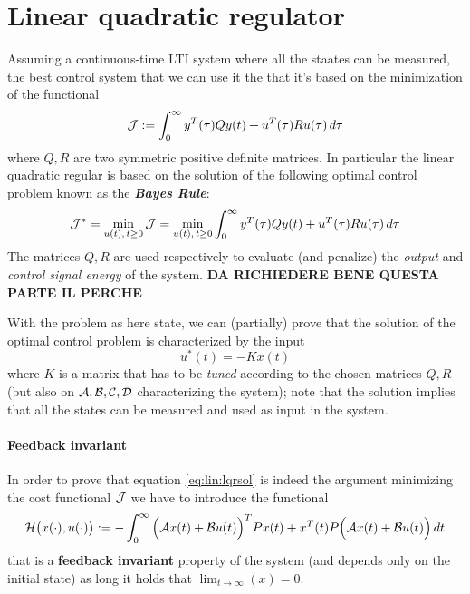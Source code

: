 \section{Linear quadratic regulator}
	Assuming a continuous-time LTI system where all the staates can be measured, the best control system that we can use it the  that it's based on the minimization of the functional
	\begin{equation}
		\mathcal{J} := \int_0^\infty y^T(\tau) Q y(t) + u^T(\tau) R u(\tau)\, d\tau
	\end{equation}
	where $Q,R$ are two symmetric positive definite matrices. In particular the linear quadratic regular is based on the solution of the following optimal control problem known as the \textbf{\textit{Bayes Rule}}:
	\begin{equation}
		\mathcal{J}^* = \min_{u(t), \, t\geq 0} \mathcal{J} = \min_{u(t), \, t\geq 0} \int_0^\infty y^T(\tau) Q y(t) + u^T(\tau) R u(\tau)\, d\tau
	\end{equation}
	The matrices $Q,R$ are used respectively to evaluate (and penalize) the \textit{output} and \textit{control signal energy} of the system. \textbf{DA RICHIEDERE BENE QUESTA PARTE IL PERCHE}
	
	With the problem as here state, we can (partially) prove that the solution of the optimal control problem is characterized by the input
	\begin{equation} \label{eq:lin:lqrsol}
		u^*(t) = - K x(t)
	\end{equation}
	where $K$ is a matrix that has to be \textit{tuned} according to the chosen matrices $Q,R$ (but also on $\mathcal{A},\mathcal{B},\mathcal{C},\mathcal{D}$ characterizing the system); note that the solution implies that all the states can be measured and used as input in the system.
		
	\paragraph{Feedback invariant} In order to prove that equation \ref{eq:lin:lqrsol} is indeed the argument minimizing the cost functional $\mathcal{J}$ we have to introduce the functional
	\begin{equation} \label{eq:lin:feedbackinvariant}
		\mathcal H\big(x(\cdot), u(\cdot)\big) := -\int_0^\infty \Big(\mathcal{A} x(t) + \mathcal{B} u(t)\Big)^T P x(t) + x^T(t) P \Big( \mathcal{A} x(t) + \mathcal{B} u(t)\Big)\, dt
	\end{equation}
	that is a \textbf{feedback invariant} property of the system (and depends only on the initial state) as long it holds that $\lim_{t\rightarrow \infty}(x) = 0$.
	
